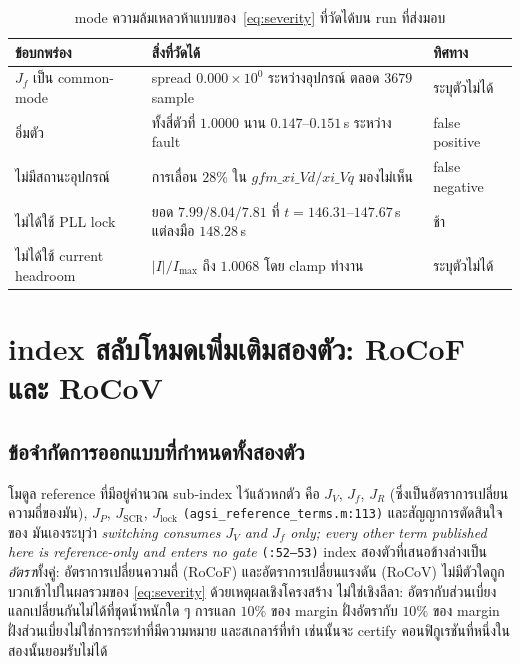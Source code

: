 \documentclass[12pt,a4paper]{article}
\theoremstyle{remark}
\newcommand{\code}[1]{\texttt{\small #1}}
\begin{document}
\begin{table}[H]
\centering
\small
\begin{tabularx}{\textwidth}{@{}lXl@{}}
\toprule
\textbf{ข้อบกพร่อง} & \textbf{สิ่งที่วัดได้} & \textbf{ทิศทาง}\\
\midrule
$J_f$ เป็น common-mode & spread $0.000\times10^{0}$ ระหว่างอุปกรณ์ ตลอด $3679$ sample & ระบุตัวไม่ได้\\
อิ่มตัว & ทั้งสี่ตัวที่ $1.0000$ นาน $0.147$--$0.151$\,s ระหว่าง fault & false positive\\
ไม่มีสถานะอุปกรณ์ & การเลื่อน $28\%$ ใน $gfm\_xi\_Vd/xi\_Vq$ มองไม่เห็น & false negative\\
ไม่ได้ใช้ PLL lock & ยอด $7.99/8.04/7.81$ ที่ $t=146.31$--$147.67$\,s แต่ลงมือ $148.28$\,s & ช้า\\
ไม่ได้ใช้ current headroom & $|I|/I_{\max}$ ถึง $1.0068$ โดย clamp ทำงาน & ระบุตัวไม่ได้\\
\bottomrule
\end{tabularx}
\caption{mode ความล้มเหลวห้าแบบของ~\eqref{eq:severity} ที่วัดได้บน run ที่ส่งมอบ}
\label{tab:gaps}
\end{table}

\section{index สลับโหมดเพิ่มเติมสองตัว: RoCoF และ RoCoV}\label{sec:newindices}

\subsection{ข้อจำกัดการออกแบบที่กำหนดทั้งสองตัว}

โมดูล reference ที่มีอยู่คำนวณ sub-index ไว้แล้วหกตัว คือ $J_V$, $J_f$, $J_R$
(ซึ่งเป็นอัตราการเปลี่ยนความถี่ของมัน), $J_P$, $J_{\text{SCR}}$,
$J_{\text{lock}}$ \code{(agsi\_reference\_terms.m:113)} และสัญญาการตัดสินใจของ
มันเองระบุว่า \emph{switching consumes $J_V$ and $J_f$ only; every other term
published here is reference-only and enters no gate} \code{(:52--53)}
index สองตัวที่เสนอข้างล่างเป็น\emph{อัตรา}ทั้งคู่: อัตราการเปลี่ยนความถี่
(RoCoF) และอัตราการเปลี่ยนแรงดัน (RoCoV) ไม่มีตัวใดถูกบวกเข้าไปในผลรวมของ
\eqref{eq:severity} ด้วยเหตุผลเชิงโครงสร้าง ไม่ใช่เชิงลีลา: อัตรากับส่วนเบี่ยง
แลกเปลี่ยนกันไม่ได้ที่ชุดน้ำหนักใด ๆ การแลก $10\%$ ของ margin ฝั่งอัตรากับ
$10\%$ ของ margin ฝั่งส่วนเบี่ยงไม่ใช่การกระทำที่มีความหมาย และสเกลาร์ที่ทำ
เช่นนั้นจะ certify คอนฟิกูเรชันที่หนึ่งในสองนั้นยอมรับไม่ได้
\end{document}
